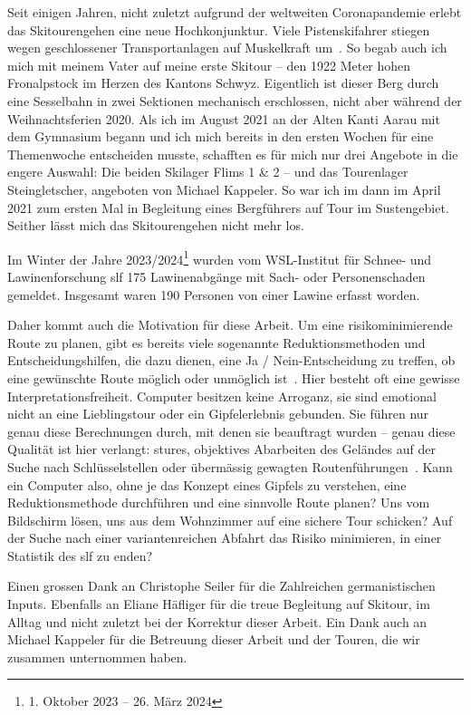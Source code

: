 


Seit einigen Jahren, nicht zuletzt aufgrund der weltweiten Coronapandemie erlebt das Skitourengehen eine neue Hochkonjunktur. Viele Pistenskifahrer stiegen wegen geschlossener Transportanlagen auf Muskelkraft um~\cite{sacCoronaTrend}. So begab auch ich mich mit meinem Vater auf meine erste Skitour – den 1922 Meter hohen Fronalpstock im Herzen des Kantons Schwyz. Eigentlich ist dieser Berg durch eine Sesselbahn in zwei Sektionen mechanisch erschlossen, nicht aber während der Weihnachtsferien 2020.
Als ich im August 2021 an der Alten Kanti Aarau mit dem Gymnasium begann und ich mich bereits in den ersten Wochen für eine Themenwoche entscheiden musste, schafften es für mich nur drei Angebote in die engere Auswahl: Die beiden Skilager Flims 1 \& 2 – und das Tourenlager Steingletscher, angeboten von Michael Kappeler. So war ich im dann im April 2021 zum ersten Mal in Begleitung eines Bergführers auf Tour im Sustengebiet. Seither lässt mich das Skitourengehen nicht mehr los.

Im Winter der Jahre 2023/2024\footnote{1. Oktober 2023 -- 26. März 2024} wurden vom WSL-Institut für Schnee- und Lawinenforschung \gls{slf} 175 Lawinenabgänge mit Sach- oder Personenschaden gemeldet. Insgesamt waren 190 Personen von einer Lawine erfasst worden.~\cite{slfWinterbericht202324}

Daher kommt auch die Motivation für diese Arbeit. Um eine risikominimierende Route zu planen, gibt es bereits viele sogenannte Reduktionsmethoden und Entscheidungshilfen, die dazu dienen, eine Ja / Nein-Entscheidung zu treffen, ob eine gewünschte Route möglich oder unmöglich ist~\cite{skitourenguruReduktionsmethoden}\cite{harveyrhynerschweizerlawinenkunde}.
Hier besteht oft eine gewisse Interpretationsfreiheit. Computer besitzen keine Arroganz, sie sind emotional nicht an eine Lieblingstour oder ein Gipfelerlebnis gebunden. Sie führen nur genau diese Berechnungen durch, mit denen sie beauftragt wurden – genau diese Qualität ist hier verlangt: stures, objektives Abarbeiten des Geländes auf der Suche nach Schlüsselstellen oder übermässig gewagten Routenführungen~\cite{harveyrhynerschweizerlawinenkunde}. Kann ein Computer also, ohne je das Konzept eines Gipfels zu verstehen, eine Reduktionsmethode durchführen und eine sinnvolle Route planen? Uns vom Bildschirm lösen, uns aus dem Wohnzimmer auf eine sichere Tour schicken? 
Auf der Suche nach einer variantenreichen Abfahrt das Risiko minimieren, in einer Statistik des \gls{slf} zu enden?

Einen grossen Dank an Christophe Seiler für die Zahlreichen germanistischen Inputs. Ebenfalls an Eliane Häfliger für die treue Begleitung auf Skitour, im Alltag und nicht zuletzt bei der Korrektur dieser Arbeit. Ein Dank auch an Michael Kappeler für die Betreuung dieser Arbeit und der Touren, die wir zusammen unternommen haben.


